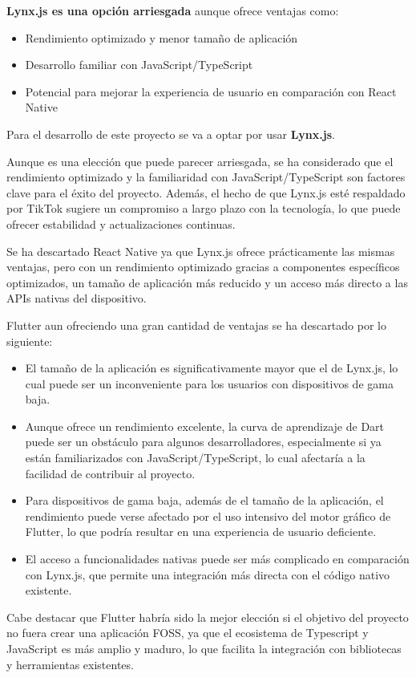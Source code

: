 \textbf{Lynx.js es una opción arriesgada} aunque ofrece ventajas como:
\begin{itemize}
    \item Rendimiento optimizado y menor tamaño de aplicación
    \item Desarrollo familiar con JavaScript/TypeScript
    \item Potencial para mejorar la experiencia de usuario en comparación con React Native
\end{itemize}

Para el desarrollo de este proyecto se va a optar por usar \textbf{Lynx.js}.

Aunque es una elección que puede parecer arriesgada, se ha considerado que el rendimiento optimizado y la familiaridad con JavaScript/TypeScript son factores clave para el éxito del proyecto.
Además, el hecho de que Lynx.js esté respaldado por TikTok sugiere un compromiso a largo plazo con la tecnología, lo que puede ofrecer estabilidad y actualizaciones continuas.

Se ha descartado React Native ya que Lynx.js ofrece prácticamente las mismas ventajas, pero con un rendimiento optimizado gracias a componentes específicos optimizados, un tamaño de aplicación más reducido y un acceso más directo a las APIs nativas del dispositivo.

Flutter aun ofreciendo una gran cantidad de ventajas se ha descartado por lo siguiente:
\begin{itemize}
    \item El tamaño de la aplicación es significativamente mayor que el de Lynx.js, lo cual puede ser un inconveniente para los usuarios con dispositivos de gama baja.
    \item Aunque ofrece un rendimiento excelente, la curva de aprendizaje de Dart puede ser un obstáculo para algunos desarrolladores, especialmente si ya están familiarizados con JavaScript/TypeScript, lo cual afectaría a la facilidad de contribuir al proyecto.
    \item Para dispositivos de gama baja, además de el tamaño de la aplicación, el rendimiento puede verse afectado por el uso intensivo del motor gráfico de Flutter, lo que podría resultar en una experiencia de usuario deficiente.
    \item El acceso a funcionalidades nativas puede ser más complicado en comparación con Lynx.js, que permite una integración más directa con el código nativo existente.
\end{itemize}
Cabe destacar que Flutter habría sido la mejor elección si el objetivo del proyecto no fuera crear una aplicación FOSS, ya que el ecosistema de Typescript y JavaScript es más amplio y maduro, lo que facilita la integración con bibliotecas y herramientas existentes.


